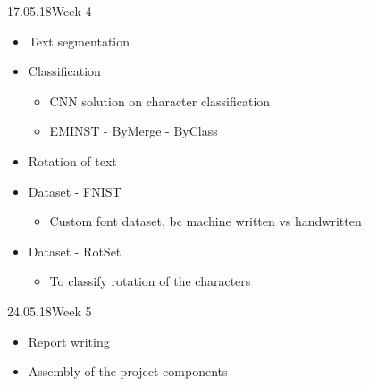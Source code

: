 \documentclass[11pt,a4paper,UKenglish]{article}
\begin{document}
\newpage
\begin{loggentry}{17.05.18}{Week 4}
\begin{itemize}
  \item{Text segmentation}
  \item{Classification}
  \begin{itemize}
    \item{CNN solution on character classification}
    \item{EMINST - ByMerge - ByClass}
  \end{itemize}
  \item{Rotation of text}
  \item{Dataset - FNIST}
  \begin{itemize}
    \item{Custom font dataset, bc machine written vs handwritten}
  \end{itemize}
  \item{Dataset - RotSet}
  \begin{itemize}
    \item{To classify rotation of the characters}
  \end{itemize}
\end{itemize}
\end{loggentry}

\newpage
\begin{loggentry}{24.05.18}{Week 5}
\begin{itemize}
  \item{Report writing}
  \item{Assembly of the project components}
\end{itemize}
\end{loggentry}
\end{document}
